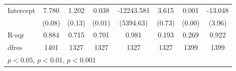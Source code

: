 \begin{landscape}
\begin{table}[H]
{\begin{tabular}{l*{7}{c}}
Intercept            &       7.780\sym{***}&       1.202\sym{***}&       0.038\sym{***}&  -12243.581\sym{*}  &       3.615\sym{***}&       0.001         &     -13.048\sym{**} \\
                    &      (0.08)         &      (0.13)         &      (0.01)         &   (5394.63)         &      (0.73)         &      (0.00)         &      (3.96)         \\
\hline
R-sqr               &       0.884         &       0.715         &       0.701         &       0.981         &       0.193         &       0.269         &       0.922         \\
dfres               &        1401         &        1327         &        1327         &        1327         &        1327         &        1399         &        1399         \\
\hline\hline
\multicolumn{8}{l}{\footnotesize \sym{*} \(p<0.05\), \sym{**} \(p<0.01\), \sym{***} \(p<0.001\)}\\
\end{tabular}%
}
\end{table}
\end{landscape}